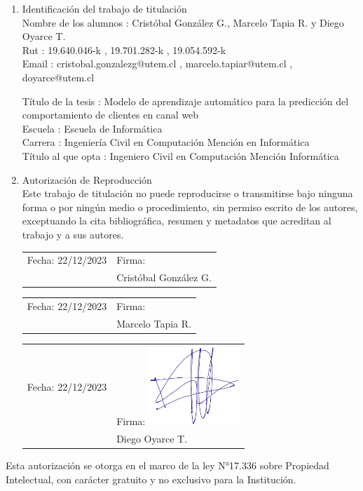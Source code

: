 \begin{enumerate}
    \item Identificación del trabajo de titulación \\
    Nombre de los alumnos
    :   Cristóbal González G., Marcelo Tapia R. y Diego Oyarce T. \\
    Rut
    : 19.640.046-k , 19.701.282-k , 19.054.592-k \\
    Email
    : cristobal.gonzalezg@utem.cl , marcelo.tapiar@utem.cl , doyarce@utem.cl

    \vspace{0.1cm}

    Título de la tesis
    : Modelo de aprendizaje automático para la predicción del comportamiento de clientes en canal web \\
    Escuela
    : Escuela de Informática \\
    Carrera
    : Ingeniería Civil en Computación Mención en Informática \\
    Título al que opta
    : Ingeniero Civil en Computación Mención Informática \\
    \item Autorización de Reproducción \\
    Este trabajo de titulación no puede reproducirse o transmitirse bajo ninguna forma o por ningún medio o procedimiento, sin permiso escrito de los autores, exceptuando la cita bibliográfica, resumen y metadatos que acreditan al trabajo y a sus autores. \\

    \vspace{3cm}

    \begin{tabular}{@{}l l}
        Fecha: 22/12/2023 \hspace{3cm} & Firma:  \\
        & Cristóbal González G.
    \end{tabular}

    \vspace{3cm}

    \begin{tabular}{@{}l l}
        Fecha: 22/12/2023 \hspace{3cm} & Firma:  \\
        & Marcelo Tapia R.
    \end{tabular}

    \vspace{1cm}

    \begin{tabular}{@{}l l}
        Fecha: 22/12/2023 \hspace{3cm} & Firma: \includegraphics[height=3cm]{img/firma-diego1.jpeg} \\
        & Diego Oyarce T.
    \end{tabular}
\end{enumerate}

Esta autorización se otorga en el marco de la ley N°17.336 sobre Propiedad Intelectual, con carácter gratuito y no exclusivo para la Institución.